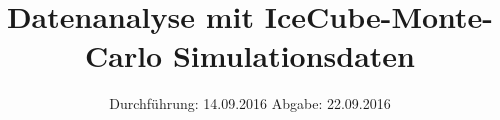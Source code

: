 

\newcommand{\bra}[1]{\langle #1 \rvert}
\newcommand{\ket}[1]{\lvert #1 \rangle}
\newcommand{\dd}[2]{\frac{\mathrm{d} #1 }{\mathrm{d} #2 } }
\newcommand{\ddd}[2]{\frac{\mathrm{d}^2 #1}{\mathrm{d} #2 ^2} }
\newcommand{\pp}[2]{\frac{\mathrm{\partial} #1 }{\mathrm{\partial}#2 } }
\newcommand{\ppp}[2]{\frac{\mathrm{\partial}^2 #1 }{\mathrm{\partial} #2 ^2} }
\newcommand{\rvec}{\vec{r}}
\newcommand{\xvec}{\vec{x}}
\newcommand{\pvec}{\vec{p}}
\newcommand{\kvec}{\vec{k}}
\newcommand{\vvec}{\vec{v}}
\newcommand{\intzi}{\int _0 ^\infty}
\newcommand{\intii}{\int _{-\infty} ^\infty}


\subject{E5b Lehrstuhlversuch}
\title{Datenanalyse mit IceCube-Monte-Carlo Simulationsdaten}
\date{
  Durchführung: 14.09.2016
  \hspace{3em}
  Abgabe: 22.09.2016
}



\maketitle
\thispagestyle{empty}
\tableofcontents
\newpage





\printbibliography



